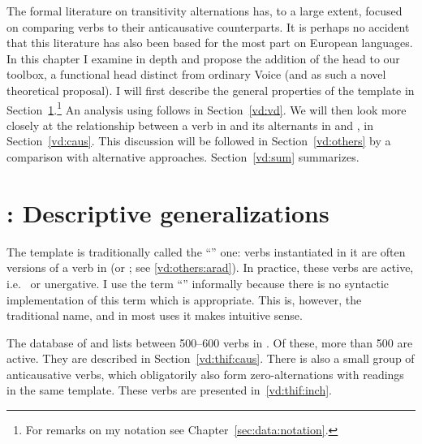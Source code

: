 The formal literature on transitivity alternations has, to a large extent, focused on comparing  verbs to their anticausative counterparts. It is perhaps no accident that this literature has also been based for the most part on European languages. In this chapter I examine {\thif} in depth and propose the addition of the head {\vd} to our toolbox, a functional head distinct from ordinary Voice (and as such a novel theoretical proposal). I will first describe the general properties of the template {\thif} in Section~\ref{vd:thif}.\footnote{For remarks on my notation see Chapter~\ref{sec:data:notation}.} An analysis using {\vd} follows in Section~\ref{vd:vd}. We will then look more closely at the relationship between a verb in {\tkal} and its alternants in {\tnif} and {\thif}, in Section~\ref{vd:caus}. This discussion will be followed in Section~\ref{vd:others} by a comparison with alternative approaches. Section~\ref{vd:sum} summarizes.


\section{\thif: Descriptive generalizations} \label{vd:thif}
The template {\thif} is traditionally called the ``'' one: verbs instantiated in it are often  versions of a verb in {\tkal} (or {\tnif}; see \ref{vd:others:arad}). In practice, these verbs are active, i.e.~ or unergative. I use the term ``'' informally because there is no syntactic implementation of this term which is appropriate. This is, however, the traditional name, and in most  uses it makes intuitive sense.

The database of \cite{ehrenfeld12} and \cite{ahdout19phd} lists between 500--600 verbs in {\thif}. Of these, more than 500 are active. They are described in Section~\ref{vd:thif:caus}. There is also a small group of anticausative verbs, which obligatorily also form zero-alternations with  readings in the same template. These verbs are presented in~\ref{vd:thif:inch}.

